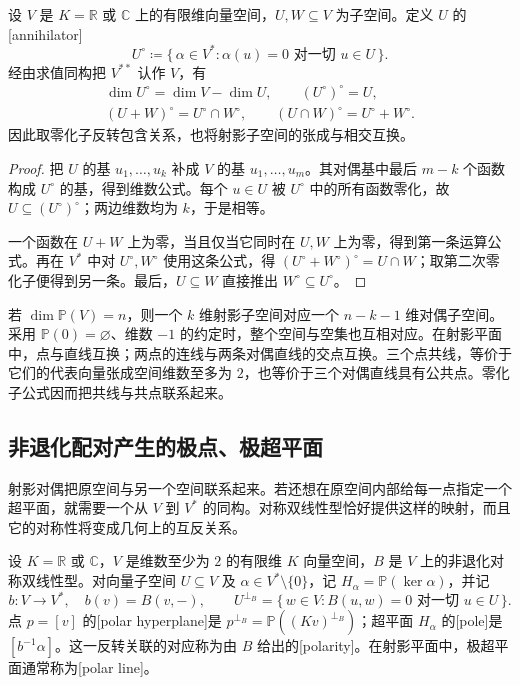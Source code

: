 \begin{proposition}\label{g1:prop:annihilator-duality}
	设 \(V\) 是 \(K=\mathbb R\) 或 \(\mathbb C\) 上的有限维向量空间，\(U,W\subseteq V\) 为子空间。定义 \(U\) 的[annihilator]
	\[
		U^\circ\coloneqq\{\,\alpha\in V^*: \alpha(u)=0\text{ 对一切 }u\in U\,\}.
	\]
	经由求值同构把 \(V^{**}\) 认作 \(V\)，有
	\[
		\begin{gathered}
			\dim U^\circ=\dim V-\dim U,\qquad (U^\circ)^\circ=U,\\
			(U+W)^\circ=U^\circ\cap W^\circ,\qquad
			(U\cap W)^\circ=U^\circ+W^\circ.
		\end{gathered}
	\]
	因此取零化子反转包含关系，也将射影子空间的张成与相交互换。
\end{proposition}
\begin{proof}
	把 \(U\) 的基 \(u_1,\ldots,u_k\) 补成 \(V\) 的基 \(u_1,\ldots,u_m\)。其对偶基中最后 \(m-k\) 个函数构成 \(U^\circ\) 的基，得到维数公式。每个 \(u\in U\) 被 \(U^\circ\) 中的所有函数零化，故 \(U\subseteq(U^\circ)^\circ\)；两边维数均为 \(k\)，于是相等。

	一个函数在 \(U+W\) 上为零，当且仅当它同时在 \(U,W\) 上为零，得到第一条运算公式。再在 \(V^*\) 中对 \(U^\circ,W^\circ\) 使用这条公式，得 \((U^\circ+W^\circ)^\circ=U\cap W\)；取第二次零化子便得到另一条。最后，\(U\subseteq W\) 直接推出 \(W^\circ\subseteq U^\circ\)。
\end{proof}

若 \(\dim\mathbb P(V)=n\)，则一个 \(k\) 维射影子空间对应一个 \(n-k-1\) 维对偶子空间。采用 \(\mathbb P(0)=\varnothing\)、维数 \(-1\) 的约定时，整个空间与空集也互相对应。在射影平面中，点与直线互换；两点的连线与两条对偶直线的交点互换。三个点共线，等价于它们的代表向量张成空间维数至多为 \(2\)，也等价于三个对偶直线具有公共点。零化子公式因而把共线与共点联系起来。

\subsection{非退化配对产生的极点、极超平面}
\label{g1:subsec:0204:02}

射影对偶把原空间与另一个空间联系起来。若还想在原空间内部给每一点指定一个超平面，就需要一个从 \(V\) 到 \(V^*\) 的同构。对称双线性型恰好提供这样的映射，而且它的对称性将变成几何上的互反关系。

\begin{definition}\label{g1:def:quadric-polarity}
	设 \(K=\mathbb R\) 或 \(\mathbb C\)，\(V\) 是维数至少为 \(2\) 的有限维 \(K\) 向量空间，\(B\) 是 \(V\) 上的非退化对称双线性型。对向量子空间 \(U\subseteq V\) 及 \(\alpha\in V^*\setminus\{0\}\)，记 \(H_\alpha=\mathbb P(\ker\alpha)\)，并记
	\[
		b:V\longrightarrow V^*,\quad b(v)=B(v,-),\qquad
		U^{\perp_B}=\{\,w\in V:B(u,w)=0\text{ 对一切 }u\in U\,\}.
	\]
	点 \(p=[v]\) 的[polar hyperplane]是 \(p^{\perp_B}=\mathbb P((Kv)^{\perp_B})\)；超平面 \(H_\alpha\) 的[pole]是 \([b^{-1}\alpha]\)。这一反转关联的对应称为由 \(B\) 给出的[polarity]。在射影平面中，极超平面通常称为[polar line]。
\end{definition}

